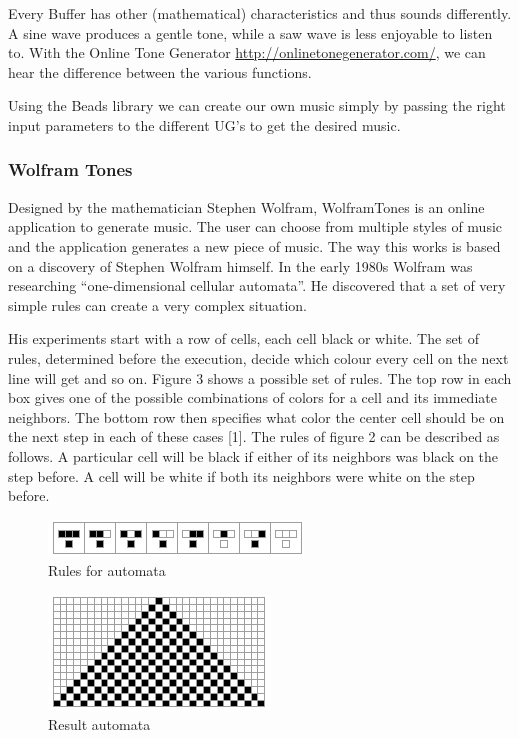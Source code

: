 \documentclass[12pt]{article}
\begin{document}
Every Buffer has other (mathematical) characteristics and thus sounds differently. A sine wave produces a gentle tone, while a saw wave is less enjoyable to listen to. With the Online Tone Generator \url{http://onlinetonegenerator.com/}, we can hear the difference between the various functions.
\newline

Using the Beads library we can create our own music simply by passing the right input parameters to the different UG's to get the desired music.

\subsubsection{Wolfram Tones}

Designed by the mathematician Stephen Wolfram, WolframTones is an online application to generate music. The user can choose from multiple styles of music and the application generates a new piece of music. The way this works is based on a discovery of Stephen Wolfram himself. In the early 1980s Wolfram was researching ``one-dimensional cellular automata''. He discovered that a set of very simple rules can create a very complex situation. 
\newline

His experiments start with a row of cells, each cell black or white. The set of rules, determined before the execution, decide which colour every cell on the next line will get and so on. Figure 3 shows a possible set of rules. The top row in each box gives one of the possible combinations of colors for a cell and its immediate neighbors. The bottom row then specifies what color the center cell should be on the next step in each of these cases [1]. The rules of figure 2 can be described as follows. A particular cell will be black if either of its neighbors was black on the step before. A cell will be white if both its neighbors were white on the step before.

\begin{figure}[h]
\centering
\includegraphics[]{img/wolframRules}
\caption{Rules for automata}
\end{figure}

\begin{figure}[h]
\centering
\includegraphics[]{img/wolframResult-15}
\caption{Result automata}
\end{figure}
\end{document}
